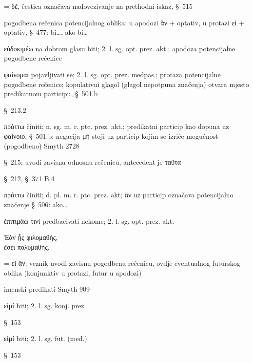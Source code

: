 \begin{description}[noitemsep]
\item[δ'] = δέ, čestica označava nadovezivanje na prethodni iskaz, §~515
\item[ἂν εὐδοκιμοίης, εἰ φαίνοιο] pogodbena rečenica potencijalnog oblika: u apodozi ἄν + optativ, u protazi εἰ + optativ, §~477: bi\dots, ako bi\dots
\item[εὐδοκιμοίης] εὐδοκιμέω na dobrom glasu biti; 2. l. sg. opt. prez. akt.; apodoza potencijalne pogodbene rečenice
\item[φαίνοιο] φαίνομαι pojavljivati se; 2. l. sg. opt. prez. medpas.; protaza potencijalne pogodbene rečenice; kopulativni glagol (glagol nepotpuna značenja) otvara mjesto predikatnom participu, §~501.b
\item[ταῦτα] §~213.2
\item[πράττων] πράττω činiti; n. sg. m. r. ptc. prez. akt.; predikatni particip kao dopuna uz φαίνοιο, §~501.b; negacija μή stoji uz particip kojim se izriče mogućnost (pogodbeno) Smyth 2728
\item[ἃ] §~215; uvodi zavisnu odnosnu rečenicu, antecedent je ταῦτα
\item[τοῖς ἄλλοις] §~212, §~371 B.4
\item[ἄν πράττουσιν] πράττω činiti; d. pl. m. r. ptc. prez. akt; ἄν uz particip označava potencijalno značenje §~506: ako\dots
\item[ἐπιτιμῴης] ἐπιτιμάω τινί predbacivati nekome; 2. l. sg. opt. prez. akt.
\end{description}

{\large
\noindent Ἐὰν ᾖς φιλομαθὴς, \\
ἔσει πολυμαθής.\\

}

\begin{description}[noitemsep]

\item[Ἐὰν] = εἰ ἄν; veznik uvodi zavisnu pogodbenu rečenicu, ovdje eventualnog futurskog oblika (konjunktiv u protazi, futur u apodozi)
\item[ᾖς φιλομαθὴς\dots\ ἔσει πολυμαθής] imenski predikati Smyth 909
\item[ᾖς] εἰμί biti; 2. l. sg. konj. prez. 
\item[φιλομαθὴς] §~153
\item[ἔσει] εἰμί biti; 2. l. sg. fut. (med.)
\item[πολυμαθής] §~153
\end{description}

